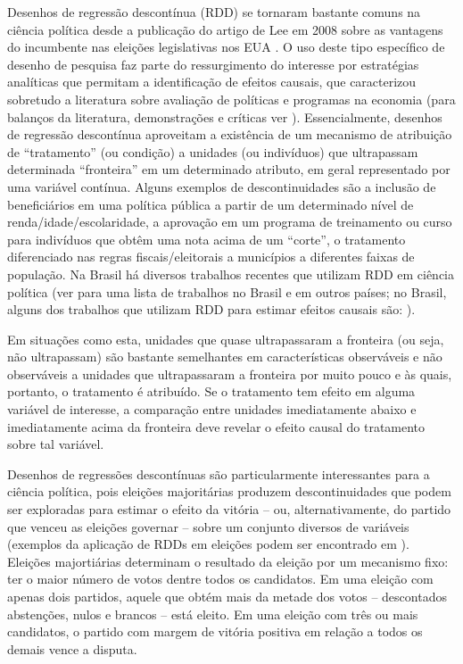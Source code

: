 Desenhos de regressão descontínua (RDD) se tornaram bastante comuns na ciência política desde a publicação do artigo de Lee em 2008 sobre as vantagens do incumbente nas eleições legislativas nos EUA \citep{Lee2008}. O uso deste tipo específico de desenho de pesquisa faz parte do ressurgimento do interesse por estratégias analíticas que permitam a identificação de efeitos causais, que caracterizou sobretudo a literatura sobre avaliação de políticas e programas na economia (para balanços da literatura, demonstrações e críticas ver \citealp*{VanderKlaauw2008, Angrist2008, Lee2008, Imbens2008, Imbens2009, Lee2010a, Dunning2012, Eggers2013}). Essencialmente, desenhos de regressão descontínua aproveitam a existência de um mecanismo de atribuição de ``tratamento'' (ou condição) a unidades (ou indivíduos) que ultrapassam determinada ``fronteira'' em um determinado atributo, em geral representado por uma variável contínua. Alguns exemplos de descontinuidades são a inclusão de beneficiários em uma política pública a partir de um determinado nível de renda/idade/escolaridade, a aprovação em um programa de treinamento ou curso para indivíduos que obtêm uma nota acima de um ``corte'', o tratamento diferenciado nas regras fiscais/eleitorais a municípios a diferentes faixas de população. Na Brasil há diversos trabalhos recentes que utilizam RDD em ciência política (ver \citealp*[pp. 70]{Dunning2012} para uma lista de trabalhos no Brasil e em outros países; no Brasil, alguns dos trabalhos que utilizam RDD para estimar efeitos causais são: \citealp*{Ferraz2008, Litschig2009, Caughey2011, Boas2011, Fujiwara2011, Titiunik2011, Avelino2012, Brambor2012, Brollo2012, Brollo2013}).

Em situações como esta, unidades que quase ultrapassaram a fronteira (ou seja, não ultrapassam) são bastante semelhantes em características observáveis e não observáveis a unidades que ultrapassaram a fronteira por muito pouco e às quais, portanto, o tratamento é atribuído. Se o tratamento tem efeito em alguma variável de interesse, a comparação entre unidades imediatamente abaixo e imediatamente acima da fronteira deve revelar o efeito causal do tratamento sobre tal variável.

Desenhos de regressões descontínuas são particularmente interessantes para a ciência política, pois eleições majoritárias produzem descontinuidades que podem ser exploradas para estimar o efeito da vitória -- ou, alternativamente, do partido que venceu as eleições governar -- sobre um conjunto diversos de variáveis (exemplos da aplicação de RDDs em eleições podem ser encontrado em \citealp*{Lee2008, Pettersson-Lidbom2008, Boas2011, Titiunik2011, Avelino2012, Brambor2012, Brollo2012, Fowler2012, Pettersson-Lidbom2008}). Eleições majortiárias determinam o resultado da eleição por um mecanismo fixo: ter o maior número de votos dentre todos os candidatos. Em uma eleição com apenas dois partidos, aquele que obtém mais da metade dos votos -- descontados abstenções, nulos e brancos -- está eleito. Em uma eleição com três ou mais candidatos, o partido com margem de vitória positiva em relação a todos os demais vence a disputa.

